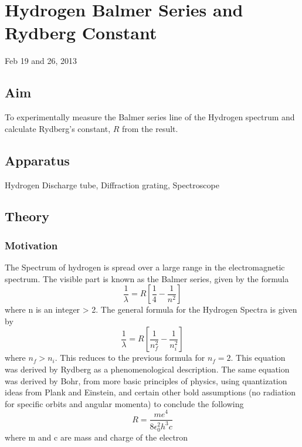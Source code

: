 \chapter{Hydrogen Balmer Series and Rydberg Constant}
\begin{flushright}
Feb 19 and 26, 2013
\end{flushright}
\section{Aim}
	To experimentally measure the Balmer series line of the Hydrogen spectrum and calculate Rydberg's constant, $R$ from the result.
\section{Apparatus}
	Hydrogen Discharge tube, Diffraction grating, Spectroscope

\section{Theory}
	\subsection{Motivation}
		The Spectrum of hydrogen is spread over a large range in the electromagnetic spectrum. The visible part is known as the Balmer series, given by the formula
		\begin{equation}
			\frac 1 \lambda = R \left[ \frac 1 4 - \frac 1 {n^2} \right]
		\end{equation}
		where n is an integer > 2. The general formula for the Hydrogen Spectra is given by
		\begin{equation}
			\frac 1 \lambda = R \left[ \frac 1 {n_f^2}  - \frac 1 {n_i^2} \right]
		\end{equation}
		where $n_f>n_i$. This reduces to the previous formula for $n_f=2$. This equation was derived by Rydberg as a phenomenological description. The same equation was derived by Bohr, from more basic principles of physics, using quantization ideas from Plank and Einstein, and certain other bold assumptions (no radiation for specific orbits and angular momenta) to conclude the following
		\begin{equation}
			R = \frac {me^4} {8\epsilon_0^2 h^3 c}
		\end{equation}
		where m and c are mass and charge of the electron
